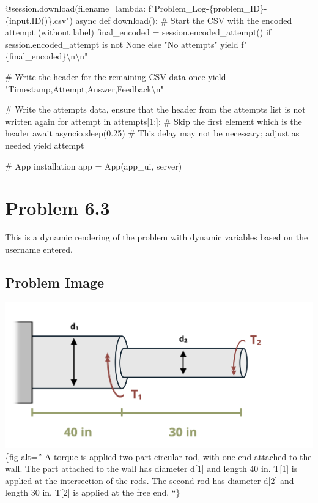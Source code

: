 \documentclass[
  letterpaper,
  DIV=11,
  numbers=noendperiod]{scrreprt}
\newenvironment{Shaded}{\begin{snugshade}}{\end{snugshade}}
\newcommand{\NormalTok}[1]{\textcolor[rgb]{0.00,0.23,0.31}{#1}}
\begin{document}
\begin{Shaded}
\begin{Highlighting}[]
\NormalTok{    @session.download(filename=lambda: f"Problem\_Log{-}\{problem\_ID\}{-}\{input.ID()\}.csv")}
\NormalTok{    async def download():}
\NormalTok{        \# Start the CSV with the encoded attempt (without label)}
\NormalTok{        final\_encoded = session.encoded\_attempt() if session.encoded\_attempt is not None else "No attempts"}
\NormalTok{        yield f"\{final\_encoded\}\textbackslash{}n\textbackslash{}n"}
        
\NormalTok{        \# Write the header for the remaining CSV data once}
\NormalTok{        yield "Timestamp,Attempt,Answer,Feedback\textbackslash{}n"}
        
\NormalTok{        \# Write the attempts data, ensure that the header from the attempts list is not written again}
\NormalTok{        for attempt in attempts[1:]:  \# Skip the first element which is the header}
\NormalTok{            await asyncio.sleep(0.25)  \# This delay may not be necessary; adjust as needed}
\NormalTok{            yield attempt}


\NormalTok{\# App installation}
\NormalTok{app = App(app\_ui, server)}
\end{Highlighting}
\end{Shaded}

\chapter*{Problem 6.3}\label{problem-6.3}


This is a dynamic rendering of the problem with dynamic variables based
on the username entered.

\section*{Problem Image}\label{problem-image-45}


\includegraphics{images/273.png}\{fig-alt='' A torque is applied two
part circular rod, with one end attached to the wall. The part attached
to the wall has diameter d{[}1{]} and length 40 in. T{[}1{]} is applied
at the intersection of the rods. The second rod has diameter d{[}2{]}
and length 30 in. T{[}2{]} is applied at the free end. ``\}
\end{document}
